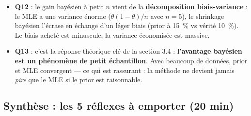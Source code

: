 \documentclass[11pt,a4paper]{article}
\begin{document}
\begin{piege}[Questions 12 et 13]
\begin{itemize}[leftmargin=4mm, itemsep=0.5mm]
  \item \textbf{Q12} : le gain bayésien à petit $n$ vient de la
        \textbf{décomposition biais-variance} : le MLE a une variance énorme
        ($\theta(1-\theta)/n$ avec $n=5$), le shrinkage bayésien l'écrase en
        échange d'un léger biais (prior à 15~\% vs vérité 10~\%). Le biais
        acheté est minuscule, la variance économisée est massive.
  \item \textbf{Q13} : c'est la réponse théorique clé de la section 3.4 :
        \textbf{l'avantage bayésien est un phénomène de petit échantillon}.
        Avec beaucoup de données, prior et MLE convergent --- ce qui est
        rassurant : la méthode ne devient jamais \emph{pire} que le MLE si le
        prior est raisonnable.
\end{itemize}
\end{piege}

\subsection{Synthèse : les 5 réflexes à emporter (20 min)}
\end{document}
